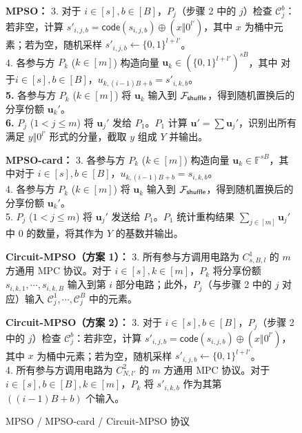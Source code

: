 \begin{figure}[!hbtp]
\begin{framed}
\begin{minipage}[c]{\textwidth}
\begin{trivlist}
\item \textbf{MPSO：}
    3. 对于 $i \in [s], b \in [B]$，$P_j$（步骤 2 中的 $j$）检查 $\mathcal{C}_j^b$：若非空，计算 $s'_{i,j,b} = \mathsf{code}(s_{i,j,b}) \oplus (x \Vert 0^{l'})$，其中 $x$ 为桶中元素；若为空，随机采样 $s'_{i,j,b} \gets \{0,1\}^{l+l'}$。\\
    4. 各参与方 $P_k$ ($k \in [m]$) 构造向量 $\textbf{u}_k \in (\{0,1\}^{l+l'})^{sB}$，其中 对于$i \in [s], b \in [B]$，$u_{k,(i-1)B+b} = s'_{i,k,b}$。\\
    \textbf{5.} 各参与方 $P_k$ ($k \in [m]$) 将 $\textbf{u}_k$ 输入到 $\mathcal{F}_\mathsf{shuffle}$，得到随机置换后的分享份额 $\textbf{u}_{k}'$。\\
    \textbf{6.} $P_j$ ($1 < j \le m$) 将 $\textbf{u}_j'$ 发给 $P_1$。$P_1$ 计算 $\textbf{u}' = \sum \textbf{u}_j'$，识别出所有满足 $y \Vert 0^{l'}$ 形式的分量，截取 $y$ 组成 $Y$ 并输出。

\item \textbf{MPSO-card：}
        3. 各参与方 $P_k$ ($k \in [m]$) 构造向量 $\textbf{u}_k \in \mathbb{F}^{sB}$，其中对于 $i \in [s], b \in [B]$，$u_{k,(i-1)B+b} = s_{i,k,b}$。\\
        4. 各参与方 $P_k$ ($k \in [m]$) 将 $\textbf{u}_k$ 输入到 $\mathcal{F}_\mathsf{shuffle}$，得到随机置换后的分享份额 $\textbf{u}_{k}'$。\\
        5. $P_j$ ($1 < j \le m$) 将 $\textbf{u}_j'$ 发送给 $P_1$。$P_1$ 统计重构结果 $\sum_{j \in [m]} \textbf{u}_j'$ 中 0 的数量，将其作为 $Y$ 的基数并输出。

\item \textbf{ Circuit-MPSO（方案 1）：}
        3. 所有参与方调用电路为 $C_{s,B,l}^1$ 的 $m$ 方通用 MPC 协议。对于 $i \in [s], k \in [m]$，$P_k$ 将分享份额 $s_{i,k,1},\cdots,s_{i,k,B}$ 输入到第 $i$ 部分电路；此外，$P_j$（与步骤 2 中的 $j$ 对应）输入 $\mathcal{C}_j^1,\cdots,\mathcal{C}_j^B$ 中的元素。

\item \textbf{ Circuit-MPSO（方案 2）：}
        3. 对于 $i \in [s], b \in [B]$，$P_j$（步骤 2 中的 $j$）检查 $\mathcal{C}_j^b$：若非空，计算 $s'_{i,j,b} = \mathsf{code}(s_{i,j,b}) \oplus (x \Vert 0^{l'})$，其中 $x$ 为桶中元素；若为空，随机采样 $s'_{i,j,b} \gets \{0,1\}^{l+l'}$。\\
        4. 所有参与方调用电路为 $C_{N,l'}^2$ 的 $m$ 方通用 MPC 协议。对于 $i \in [s], b \in [B], k \in [m]$，$P_k$ 将 $s'_{i,k,b}$ 作为其第 $((i-1)B+b)$ 个输入。
\end{trivlist}
\end{minipage}
\end{framed}
\caption{MPSO / MPSO-card / Circuit-MPSO 协议}\label{fig:proto-MPSO}
\end{figure}

